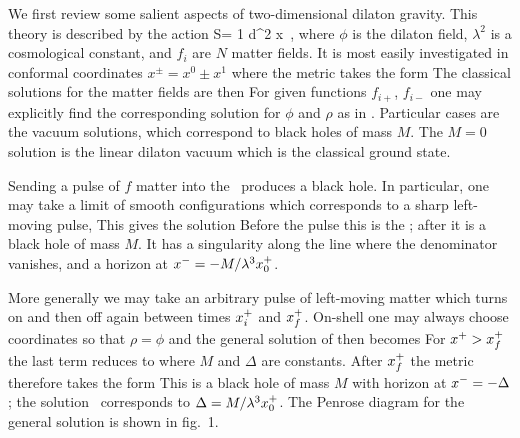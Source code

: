 
We first review some salient aspects of two-dimensional dilaton gravity.
This theory is described by the action
%
\eqn\one
{S= { 1 \pi}\int d^2 x\Bigl[e^{-2\phi}(R+4(\nabla\phi)^2
+4\lambda^2)
-\half\sum\limits^N_{i=1}(\nabla f_i)^2\Bigr]\ ,}
%
where $\phi$ is the dilaton field, $\lambda^2$ is a cosmological constant,
and $f_i$ are $N$ matter fields.  It is most easily investigated in
conformal coordinates $x^\pm=x^0\pm x^1$
where the metric takes the form
%
\eqn{}
%
The classical solutions for the matter fields are then
%
\eqn{}
%
For given functions $f_{i+}$, $f_{i-}$ one may
explicitly find the corresponding solution for $\phi$ and $\rho$ as in
.  Particular cases are the vacuum
solutions,
%
\eqn{}
%
which correspond to black holes of mass $M$.  The $M=0$ solution is the
linear dilaton vacuum which is the classical ground state.

Sending a pulse of $f$ matter into the \LDV\ produces a black hole.  In
particular, one may take a limit of smooth configurations which corresponds
to a sharp left-moving pulse,
%
\eqn{}
%
This gives the solution
%
\eqn{}
%
Before the pulse this is the \LDV; after it is a black hole of mass $M$.
It has a singularity along the line where the denominator vanishes, and a
horizon at $x^-=-M/\lambda^3 x^+_0$.

More generally we may take an arbitrary pulse of left-moving matter which
turns on and then off again between times $x^+_i$ and $x^+_f$.  On-shell
one may always choose coordinates so that $\rho=\phi$ and the general
solution of \refs{\CGHS} then becomes
%
\eqn\gensol{e^{-2\rho} = e^{-2\phi} =-\lambda^2 \xp\xm -\int d\xp
\int d\xp T^f_{++}\ . }
%
For $x^+>x^+_f$ the last term reduces to
%
\eqn{}
%
where $M$ and $\Delta$ are constants.  After $x^+_f$ the metric therefore
takes the form
%
\eqn\fmet{ds^2 = -{d\xp d\xm \over {M\over\lambda} - \lambda^2\xp(\xm
+\Delta)}\ .}
%
This is a black hole of mass $M$ with horizon at $x^-=-\Delta$;
the solution \collsoln\ corresponds to $\Delta=M/\lambda^3x^+_0$.
The Penrose diagram for the general solution is shown in fig.~1.

